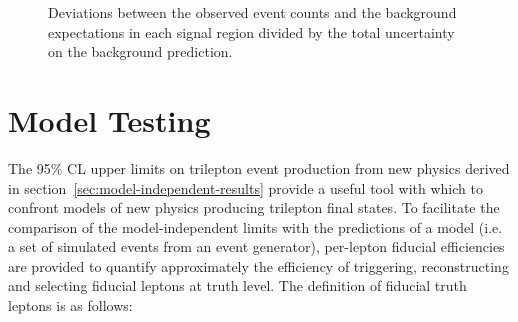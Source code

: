 \begin{figure}
	\centering
	\caption{Deviations between the observed event counts and the background expectations in each signal region divided by the total uncertainty on the background prediction.}
	\label{fig:model-independent-summary-sigma}
\end{figure}



\section{Model Testing}\label{sec:model-independent-model-testing}
The 95\% CL upper limits on trilepton event production from new physics derived in section~\ref{sec:model-independent-results} provide a useful tool with which to confront models of new physics producing trilepton final states. To facilitate the comparison of the model-independent limits with the predictions of a model (i.e. a set of simulated events from an event generator), per-lepton fiducial efficiencies are provided to quantify approximately the efficiency of triggering, reconstructing and selecting fiducial leptons at truth level. The definition of fiducial truth leptons is as follows: 

